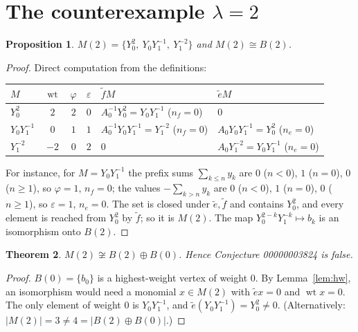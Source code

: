 \documentclass[11pt]{article}
\newtheorem{theorem}{Theorem}
\newtheorem{proposition}[theorem]{Proposition}
\theoremstyle{definition}
\theoremstyle{remark}
\newcommand{\et}{\tilde e}
\newcommand{\ft}{\tilde f}
\newcommand{\wt}{\operatorname{wt}}
\begin{document}
\section{The counterexample \texorpdfstring{$\lambda=2$}{lambda = 2}}
\begin{proposition}\label{prop:M2}
$M(2)=\{Y_0^2,\ Y_0Y_1^{-1},\ Y_1^{-2}\}$ and $M(2)\cong B(2)$.
\end{proposition}
\begin{proof}
Direct computation from the definitions:
\begin{center}
\begin{tabular}{lcccll}
\toprule
$M$ & $\wt$ & $\varphi$ & $\varepsilon$ & $\ft M$ & $\et M$\\
\midrule
$Y_0^2$ & $2$ & $2$ & $0$ & $A_0^{-1}Y_0^2=Y_0Y_1^{-1}$ ($n_f=0$) & $0$\\
$Y_0Y_1^{-1}$ & $0$ & $1$ & $1$ & $A_0^{-1}Y_0Y_1^{-1}=Y_1^{-2}$ ($n_f=0$) & $A_0Y_0Y_1^{-1}=Y_0^2$ ($n_e=0$)\\
$Y_1^{-2}$ & $-2$ & $0$ & $2$ & $0$ & $A_0Y_1^{-2}=Y_0Y_1^{-1}$ ($n_e=0$)\\
\bottomrule
\end{tabular}
\end{center}
For instance, for $M=Y_0Y_1^{-1}$ the prefix sums $\sum_{k\le n}y_k$ are $0$
($n<0$), $1$ ($n=0$), $0$ ($n\ge1$), so $\varphi=1$, $n_f=0$; the values
$-\sum_{k>n}y_k$ are $0$ ($n<0$), $1$ ($n=0$), $0$ ($n\ge1$), so
$\varepsilon=1$, $n_e=0$. The set is closed under $\et,\ft$ and contains $Y_0^2$,
and every element is reached from $Y_0^2$ by $\ft$; so it is $M(2)$. The map
$Y_0^{2-k}Y_1^{-k}\mapsto b_k$ is an isomorphism onto $B(2)$.
\end{proof}

\begin{theorem}\label{thm:main}
$M(2)\not\cong B(2)\oplus B(0)$. Hence Conjecture 00000003824 is false.
\end{theorem}
\begin{proof}
$B(0)=\{b_0\}$ is a highest-weight vertex of weight $0$. By
Lemma~\ref{lem:hw}, an isomorphism would need a monomial $x\in M(2)$ with
$\et x=0$ and $\wt x=0$. The only element of weight $0$ is $Y_0Y_1^{-1}$, and
$\et(Y_0Y_1^{-1})=Y_0^2\ne0$. (Alternatively: $|M(2)|=3\neq4=|B(2)\oplus B(0)|$.)
\end{proof}
\end{document}
